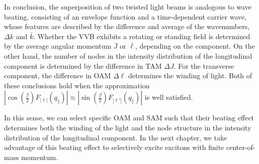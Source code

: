 In conclusion, the superposition of two twisted light beams is analogous to wave beating, consisting of an envelope function and a time-dependent carrier wave, whose features are described by the difference and average of the wavenumbers, $\Delta k$ and $\bar{k}$. Whether the VVB exhibits a rotating or standing field is determined by the average angular momentum $\bar{J}$ or $\bar{\ell}$, depending on the component. On the other hand, the number of nodes in the intensity distribution of the longitudinal component is determined by the difference in TAM $\Delta J$. For the transverse component, the difference in OAM $\Delta \ell$ determines the winding of light. Both of these conclusions hold when the approximation $|\cos\left(\tfrac{\beta}{2}\right)F_{\left|\ell\right|}(q_{\parallel})| \approx |\sin\left(\tfrac{\beta}{2}\right)F_{\left|\ell'\right|}(q_{\parallel})|$ is well satisfied.

In this sense, we can select specific OAM and SAM such that their beating effect determines both the winding of the light and the node structure in the intensity distribution of the longitudinal component. In the next chapter, we take advantage of this beating effect to selectively excite excitons with finite center-of-mass momentum.







